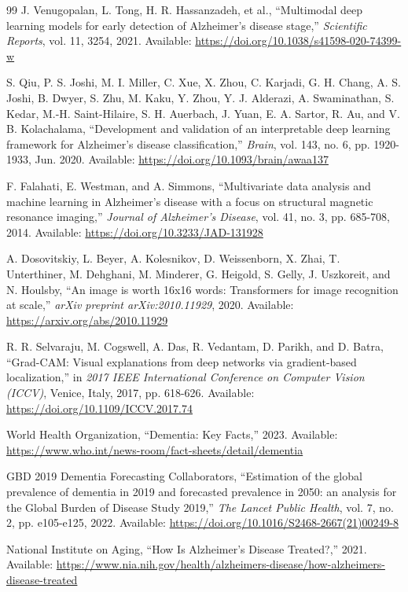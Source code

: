 \documentclass[pdflatex,sn-mathphys-num]{sn-jnl}%
\theoremstyle{thmstyleone}%
\theoremstyle{thmstyletwo}%
\theoremstyle{thmstylethree}%
\begin{document}
\begin{thebibliography}{99}
 J. Venugopalan, L. Tong, H. R. Hassanzadeh, et al., ``Multimodal deep learning models for early detection of Alzheimer's disease stage,'' \textit{Scientific Reports}, vol. 11, 3254, 2021. Available: \url{https://doi.org/10.1038/s41598-020-74399-w}

 S. Qiu, P. S. Joshi, M. I. Miller, C. Xue, X. Zhou, C. Karjadi, G. H. Chang, A. S. Joshi, B. Dwyer, S. Zhu, M. Kaku, Y. Zhou, Y. J. Alderazi, A. Swaminathan, S. Kedar, M.-H. Saint-Hilaire, S. H. Auerbach, J. Yuan, E. A. Sartor, R. Au, and V. B. Kolachalama, ``Development and validation of an interpretable deep learning framework for Alzheimer's disease classification,'' \textit{Brain}, vol. 143, no. 6, pp. 1920-1933, Jun. 2020. Available: \url{https://doi.org/10.1093/brain/awaa137}

 F. Falahati, E. Westman, and A. Simmons, ``Multivariate data analysis and machine learning in Alzheimer's disease with a focus on structural magnetic resonance imaging,'' \textit{Journal of Alzheimer's Disease}, vol. 41, no. 3, pp. 685-708, 2014. Available: \url{https://doi.org/10.3233/JAD-131928}

 A. Dosovitskiy, L. Beyer, A. Kolesnikov, D. Weissenborn, X. Zhai, T. Unterthiner, M. Dehghani, M. Minderer, G. Heigold, S. Gelly, J. Uszkoreit, and N. Houlsby, ``An image is worth 16x16 words: Transformers for image recognition at scale,'' \textit{arXiv preprint arXiv:2010.11929}, 2020. Available: \url{https://arxiv.org/abs/2010.11929}

 R. R. Selvaraju, M. Cogswell, A. Das, R. Vedantam, D. Parikh, and D. Batra, ``Grad-CAM: Visual explanations from deep networks via gradient-based localization,'' in \textit{2017 IEEE International Conference on Computer Vision (ICCV)}, Venice, Italy, 2017, pp. 618-626. Available: \url{https://doi.org/10.1109/ICCV.2017.74}

 World Health Organization, ``Dementia: Key Facts,'' 2023. Available: \url{https://www.who.int/news-room/fact-sheets/detail/dementia}

 GBD 2019 Dementia Forecasting Collaborators, ``Estimation of the global prevalence of dementia in 2019 and forecasted prevalence in 2050: an analysis for the Global Burden of Disease Study 2019,'' \textit{The Lancet Public Health}, vol. 7, no. 2, pp. e105-e125, 2022. Available: \url{https://doi.org/10.1016/S2468-2667(21)00249-8}

 National Institute on Aging, ``How Is Alzheimer's Disease Treated?,'' 2021. Available: \url{https://www.nia.nih.gov/health/alzheimers-disease/how-alzheimers-disease-treated}


\end{thebibliography}
\end{document}
